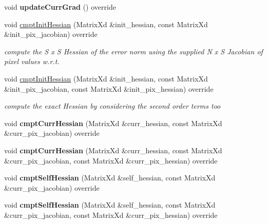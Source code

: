 \begin{DoxyCompactItemize}
\item 
\hypertarget{classRIU_a40c8be4e35525318305ce0cee9aa3d8f}{void {\bfseries update\-Curr\-Grad} () override}\label{classRIU_a40c8be4e35525318305ce0cee9aa3d8f}

\item 
void \hyperlink{classRIU_a83f3ce777e1d2f8692f0faa99fd8b863}{cmpt\-Init\-Hessian} (Matrix\-Xd \&init\-\_\-hessian, const Matrix\-Xd \&init\-\_\-pix\-\_\-jacobian) override
\begin{DoxyCompactList}\small\item\em compute the S x S Hessian of the error norm using the supplied N x S Jacobian of pixel values w.\-r.\-t. \end{DoxyCompactList}\item 
\hypertarget{classRIU_a77bdd911ad1176e15a63a4aaa71505f1}{void \hyperlink{classRIU_a77bdd911ad1176e15a63a4aaa71505f1}{cmpt\-Init\-Hessian} (Matrix\-Xd \&init\-\_\-hessian, const Matrix\-Xd \&init\-\_\-pix\-\_\-jacobian, const Matrix\-Xd \&init\-\_\-pix\-\_\-hessian) override}\label{classRIU_a77bdd911ad1176e15a63a4aaa71505f1}

\begin{DoxyCompactList}\small\item\em compute the exact Hessian by considering the second order terms too \end{DoxyCompactList}\item 
\hypertarget{classRIU_a393eafd76ef30c0f223627844b08b253}{void {\bfseries cmpt\-Curr\-Hessian} (Matrix\-Xd \&curr\-\_\-hessian, const Matrix\-Xd \&curr\-\_\-pix\-\_\-jacobian) override}\label{classRIU_a393eafd76ef30c0f223627844b08b253}

\item 
\hypertarget{classRIU_a07e4991013021dec3fe775f213478b30}{void {\bfseries cmpt\-Curr\-Hessian} (Matrix\-Xd \&curr\-\_\-hessian, const Matrix\-Xd \&curr\-\_\-pix\-\_\-jacobian, const Matrix\-Xd \&curr\-\_\-pix\-\_\-hessian) override}\label{classRIU_a07e4991013021dec3fe775f213478b30}

\item 
\hypertarget{classRIU_a64d54ed45f33fcb99e3ffe6df97f8b5a}{void {\bfseries cmpt\-Self\-Hessian} (Matrix\-Xd \&self\-\_\-hessian, const Matrix\-Xd \&curr\-\_\-pix\-\_\-jacobian) override}\label{classRIU_a64d54ed45f33fcb99e3ffe6df97f8b5a}

\item 
\hypertarget{classRIU_ab21f478dfda080a6906399481e20683d}{void {\bfseries cmpt\-Self\-Hessian} (Matrix\-Xd \&self\-\_\-hessian, const Matrix\-Xd \&curr\-\_\-pix\-\_\-jacobian, const Matrix\-Xd \&curr\-\_\-pix\-\_\-hessian) override}\label{classRIU_ab21f478dfda080a6906399481e20683d}


\end{DoxyCompactItemize}
